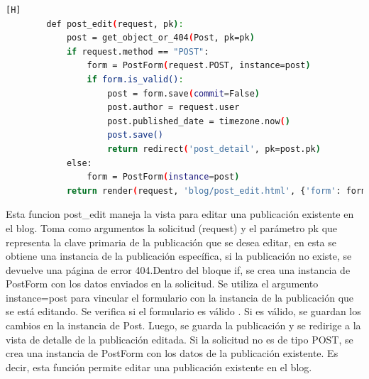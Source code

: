 \documentclass{article}
\begin{document}
	\begin{lstlisting}[language=bash,caption={Segunda parte de views.py}][H]
        def post_edit(request, pk):
            post = get_object_or_404(Post, pk=pk)
            if request.method == "POST":
                form = PostForm(request.POST, instance=post)
                if form.is_valid():
                    post = form.save(commit=False)
                    post.author = request.user
                    post.published_date = timezone.now()
                    post.save()
                    return redirect('post_detail', pk=post.pk)
            else:
                form = PostForm(instance=post)
            return render(request, 'blog/post_edit.html', {'form': form})
	\end{lstlisting}
        Esta funcion post\_edit maneja la vista para editar una publicación existente en el blog. Toma como argumentos la solicitud (request) y el parámetro pk que representa la clave primaria de la publicación que se desea editar, en esta se obtiene una instancia de la publicación específica, si la publicación no existe, se devuelve una página de error 404.Dentro del bloque if, se crea una instancia de PostForm con los datos enviados en la solicitud. Se utiliza el argumento instance=post para vincular el formulario con la instancia de la publicación que se está editando.
        Se verifica si el formulario es válido . Si es válido, se guardan los cambios en la instancia de Post. Luego, se guarda la publicación y se redirige a la vista de detalle de la publicación editada.
        Si la solicitud no es de tipo POST, se crea una instancia de PostForm con los datos de la publicación existente. Es decir, esta función permite editar una publicación existente en el blog.
\end{document}
